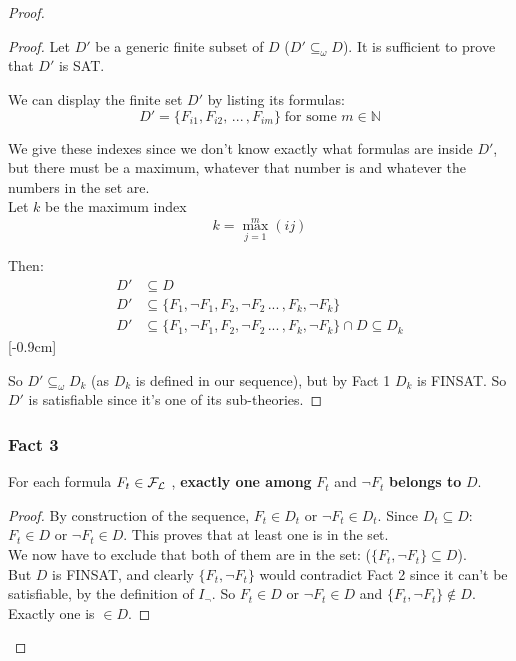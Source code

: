 \begin{proof}
		\begin{proof}
			Let $D'$ be a generic finite subset of $D$ ($D' \subseteq_\omega D$). It is sufficient to prove that $D'$ is SAT.

			We can display the finite set $D'$ by listing its formulas:
			$$ D' = \{F_{i1}, F_{i2}, \, ... \, , F_{im}\} \; \text{for some } m \in \mathbb{N} $$

			We give these indexes since we don't know exactly what formulas are inside $D'$, but there must be a maximum, whatever that number is and whatever the numbers in the set are.\\

			Let $k$ be the maximum index
			$$ k = \max_{j=1}^m (ij) $$

			Then:
			\begin{align*}
			  D' &\subseteq D \\
			  D' &\subseteq \{F_1, \neg F_1, F_2, \neg F_2 \, ... \, , F_k, \neg F_k\}\\
			  D' &\subseteq \{F_1, \neg F_1, F_2, \neg F_2 \, ... \, , F_k, \neg F_k\} \cap D \subseteq D_k
			\end{align*}

			So $D' \subseteq_\omega D_k$ (as $D_k$ is defined in our sequence), but by Fact 1 $D_k$ is FINSAT. So $D'$ is satisfiable since it's one of its sub-theories.
		\end{proof}

		\subsubsection{Fact 3}

		\begin{center}
		For each formula $F_t \in \mathcal{F}_\mathcal{L}$ , \textbf{exactly one among} $F_t$ and $\neg F_t$ \textbf{belongs to} $D$.
		\end{center}
		\begin{proof}
			By construction of the sequence, $F_t \in D_t$ or $\neg F_t \in D_t$. Since $D_t \subseteq D$: $F_t \in D$ or $\neg F_t \in D$. This proves that at least one is in the set. \\

			We now have to exclude that both of them are in the set: ($\{F_t, \neg F_t\} \subseteq D$).\\
			But $D$ is FINSAT, and clearly $\{F_t, \neg F_t\}$ would contradict Fact 2 since it can't be satisfiable, by the definition of $I_\neg$. So $F_t \in D$ or $\neg F_t \in D$ and $\{F_t, \neg F_t\} \notin D$. Exactly one is $\in D$.
		\end{proof}


\end{proof}
